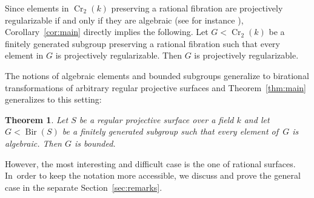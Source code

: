 \documentclass[JEP,XML,SOM,Unicode, NoEqCountersInSection,published]{cedram}
\newcommand{\Bir}{\operatorname{Bir}}
\newcommand{\Cr}{\operatorname{Cr}}
\theoremstyle{plain}
\newtheorem{theorem}{Theorem}[section]
\theoremstyle{definition}
\begin{document}
Since elements in $\Cr_2(k)$ preserving a rational fibration are projectively regularizable if and only if they are algebraic {(see for instance \cite[Table\,1]{lonjou2021actions})}, Corollary~\ref{cor:main} directly implies the following.
Let $G<\Cr_2(k)$ be a finitely generated subgroup preserving a rational fibration such that every element in $G$ is projectively regularizable. Then $G$ is projectively regularizable.

The notions of algebraic elements {and bounded subgroups} generalize to birational transformations of arbitrary regular projective surfaces and Theorem~\ref{thm:main} generalizes to this setting:

\begin{theorem}\label{thm:main_general}
Let $S$ be a regular projective surface over a field $k$ and let $G <\Bir(S)$ be a finitely generated subgroup such that every element of~$G$ is algebraic. Then $G$ is {bounded}.
\end{theorem}

However, the most interesting and difficult case is the one of rational surfaces. In~order to keep the notation more accessible, we discuss and prove the general case in the separate Section~\ref{sec:remarks}.
\end{document}
